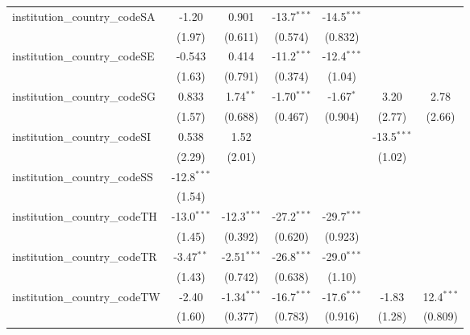 \begin{tabular}{lcccccc}
   institution\_country\_codeSA          & -1.20         & 0.901         & -13.7$^{***}$ & -14.5$^{***}$ &               &   \\   
                                         & (1.97)        & (0.611)       & (0.574)       & (0.832)       &               &   \\   
   institution\_country\_codeSE          & -0.543        & 0.414         & -11.2$^{***}$ & -12.4$^{***}$ &               &   \\   
                                         & (1.63)        & (0.791)       & (0.374)       & (1.04)        &               &   \\   
   institution\_country\_codeSG          & 0.833         & 1.74$^{**}$   & -1.70$^{***}$ & -1.67$^{*}$   & 3.20          & 2.78\\   
                                         & (1.57)        & (0.688)       & (0.467)       & (0.904)       & (2.77)        & (2.66)\\   
   institution\_country\_codeSI          & 0.538         & 1.52          &               &               & -13.5$^{***}$ &   \\   
                                         & (2.29)        & (2.01)        &               &               & (1.02)        &   \\   
   institution\_country\_codeSS          & -12.8$^{***}$ &               &               &               &               &   \\   
                                         & (1.54)        &               &               &               &               &   \\   
   institution\_country\_codeTH          & -13.0$^{***}$ & -12.3$^{***}$ & -27.2$^{***}$ & -29.7$^{***}$ &               &   \\   
                                         & (1.45)        & (0.392)       & (0.620)       & (0.923)       &               &   \\   
   institution\_country\_codeTR          & -3.47$^{**}$  & -2.51$^{***}$ & -26.8$^{***}$ & -29.0$^{***}$ &               &   \\   
                                         & (1.43)        & (0.742)       & (0.638)       & (1.10)        &               &   \\   
   institution\_country\_codeTW          & -2.40         & -1.34$^{***}$ & -16.7$^{***}$ & -17.6$^{***}$ & -1.83         & 12.4$^{***}$\\   
                                         & (1.60)        & (0.377)       & (0.783)       & (0.916)       & (1.28)        & (0.809)\\   

\end{tabular}
